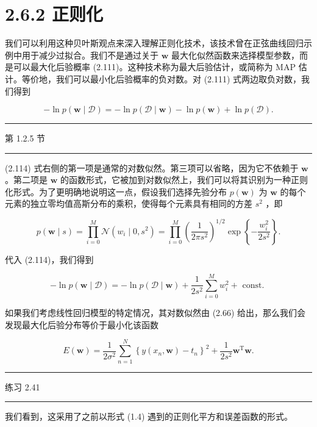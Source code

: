 \documentclass[10pt]{report}
\newcommand{\HRule}{\begin{center}\rule{0.9\linewidth}{0.2mm}\end{center}}
\begin{document}
\section*{2.6.2 正则化}

我们可以利用这种贝叶斯观点来深入理解正则化技术，该技术曾在正弦曲线回归示例中用于减少过拟合。我们不是通过关于 \(\mathbf{w}\) 最大化似然函数来选择模型参数，而是可以最大化后验概率 (2.111)。这种技术称为最大后验估计，或简称为 MAP 估计。等价地，我们可以最小化后验概率的负对数。对 (2.111) 式两边取负对数，我们得到

\[
- \ln p\left( {\mathbf{w} \mid  \mathcal{D}}\right)  =  - \ln p\left( {\mathcal{D} \mid  \mathbf{w}}\right)  - \ln p\left( \mathbf{w}\right)  + \ln p\left( \mathcal{D}\right) . \tag{2.114}
\]

\HRule

第 1.2.5 节

\HRule

(2.114) 式右侧的第一项是通常的对数似然。第三项可以省略，因为它不依赖于 \(\mathbf{w}\) 。第二项是 \(\mathbf{w}\) 的函数形式，它被加到对数似然上，我们可以将其识别为一种正则化形式。为了更明确地说明这一点，假设我们选择先验分布 \(p\left( \mathbf{w}\right)\) 为 \(\mathbf{w}\) 的每个元素的独立零均值高斯分布的乘积，使得每个元素具有相同的方差 \({s}^{2}\) ，即

\[
p\left( {\mathbf{w} \mid  s}\right)  = \mathop{\prod }\limits_{{i = 0}}^{M}\mathcal{N}\left( {{w}_{i} \mid  0,{s}^{2}}\right)  = \mathop{\prod }\limits_{{i = 0}}^{M}{\left( \frac{1}{{2\pi }{s}^{2}}\right) }^{1/2}\exp \left\{  {-\frac{{w}_{i}^{2}}{2{s}^{2}}}\right\}  . \tag{2.115}
\]

代入 (2.114)，我们得到

\[
- \ln p\left( {\mathbf{w} \mid  \mathcal{D}}\right)  =  - \ln p\left( {\mathcal{D} \mid  \mathbf{w}}\right)  + \frac{1}{2{s}^{2}}\mathop{\sum }\limits_{{i = 0}}^{M}{w}_{i}^{2} + \text{ const. } \tag{2.116}
\]

如果我们考虑线性回归模型的特定情况，其对数似然由 (2.66) 给出，那么我们会发现最大化后验分布等价于最小化该函数

\[
E\left( \mathbf{w}\right)  = \frac{1}{2{\sigma }^{2}}\mathop{\sum }\limits_{{n = 1}}^{N}{\left\{  y\left( {x}_{n},\mathbf{w}\right)  - {t}_{n}\right\}  }^{2} + \frac{1}{2{s}^{2}}{\mathbf{w}}^{\mathrm{T}}\mathbf{w}. \tag{2.117}
\]

\HRule

练习 2.41

\HRule

我们看到，这采用了之前以形式 (1.4) 遇到的正则化平方和误差函数的形式。
\end{document}

